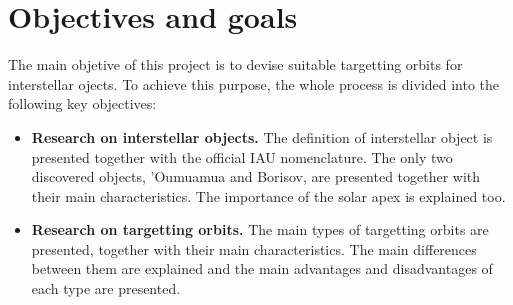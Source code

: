 \section{Objectives and goals}

The main objetive of this project is to devise suitable targetting orbits for
interstellar ojects. To achieve this purpose, the whole process is divided
into the following key objectives:

\begin{itemize}

    \item \textbf{Research on interstellar objects.}
        The definition of interstellar object is presented together with the
        official IAU nomenclature. The only two discovered objects,
        'Oumuamua and Borisov, are presented together with their main
        characteristics. The importance of the solar apex is explained
        too.

    \item \textbf{Research on targetting orbits.}
        The main types of targetting orbits are presented, together with their
        main characteristics. The main differences between them are explained
        and the main advantages and disadvantages of each type are presented.

\end{itemize}

